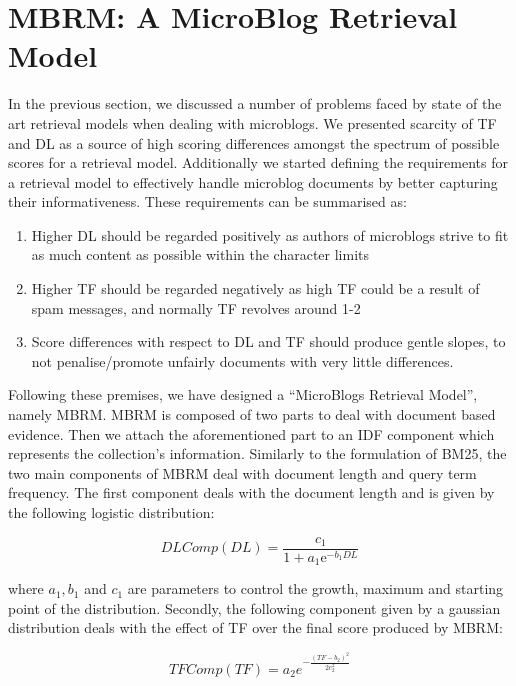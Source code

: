 \section{MBRM: A MicroBlog Retrieval Model}
\label{MBRM-section}
In the previous section, we discussed a number of problems faced by state of the art retrieval models when dealing with microblogs. We presented scarcity of TF and DL as a source of high scoring differences amongst the spectrum of possible scores for a retrieval model. Additionally we started defining the requirements for a retrieval model to effectively handle microblog documents by better capturing their informativeness. These requirements can be summarised as: 

\begin{enumerate}
\item Higher DL should be regarded positively as authors of microblogs strive to fit as much content as possible within the character limits
\item Higher TF should be regarded negatively as high TF could be a result of spam messages, and normally TF revolves around 1-2
\item Score differences with respect to DL and TF should produce gentle slopes, to not penalise/promote unfairly documents with very little differences.
\end{enumerate}

Following these premises, we have designed a ``MicroBlogs Retrieval Model'', namely MBRM. MBRM is composed of two parts to deal with document based evidence. Then we attach the aforementioned part to an IDF component which represents the collection's information. Similarly to the formulation of BM25, the two main components of MBRM deal with document length and query term frequency. The first component deals with the document length and is given by the following logistic distribution:

\begin{equation}
DLComp(DL)={\frac  {c_1}{1+{a_1\mathrm  e}^{{-b_1DL}}}}
\end{equation}

where \(a_1, b_1\) and \(c_1\) are parameters to control the growth, maximum and starting point of the distribution. Secondly, the following component given by a gaussian distribution deals with the effect of TF over the final score produced by MBRM:

\begin{equation}
TFComp\left(TF\right)=a_2e^{-{\frac {(TF-b_2)^{2}}{2c_2^{2}}}}
\end{equation}

